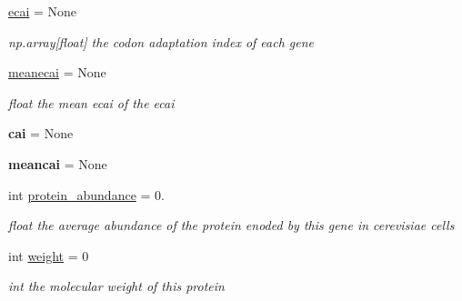 \begin{DoxyCompactItemize}
\mbox{\label{class_py_c_u_b_1_1homology_1_1homology_a7f37b98057afffafaeae13285490b229}} 
\mbox{\hyperlink{class_py_c_u_b_1_1homology_1_1homology_a7f37b98057afffafaeae13285490b229}{ecai}} = None
\begin{DoxyCompactList}\small\item\em np.\+array\mbox{[}float\mbox{]} the codon adaptation index of each gene \end{DoxyCompactList}\item 
\mbox{\label{class_py_c_u_b_1_1homology_1_1homology_a42eb34bc6c1e774b237e479f83cd6bf7}} 
\mbox{\hyperlink{class_py_c_u_b_1_1homology_1_1homology_a42eb34bc6c1e774b237e479f83cd6bf7}{meanecai}} = None
\begin{DoxyCompactList}\small\item\em float the mean ecai of the ecai \end{DoxyCompactList}\item 
\mbox{\label{class_py_c_u_b_1_1homology_1_1homology_a9dea84f934449466e561988ea1d2031d}} 
{\bfseries cai} = None
\item 
\mbox{\label{class_py_c_u_b_1_1homology_1_1homology_a97977b754401226826b71af612e6d33e}} 
{\bfseries meancai} = None
\item 
\mbox{\label{class_py_c_u_b_1_1homology_1_1homology_a0438db8bca39f5964292ea3e5f3ae519}} 
int \mbox{\hyperlink{class_py_c_u_b_1_1homology_1_1homology_a0438db8bca39f5964292ea3e5f3ae519}{protein\+\_\+abundance}} = 0.
\begin{DoxyCompactList}\small\item\em float the average abundance of the protein enoded by this gene in cerevisiae cells \end{DoxyCompactList}\item 
\mbox{\label{class_py_c_u_b_1_1homology_1_1homology_ae230e5a5e755ffeb7166ceef23cfaa90}} 
int \mbox{\hyperlink{class_py_c_u_b_1_1homology_1_1homology_ae230e5a5e755ffeb7166ceef23cfaa90}{weight}} = 0
\begin{DoxyCompactList}\small\item\em int the molecular weight of this protein \end{DoxyCompactList}\item 

\end{DoxyCompactItemize}
